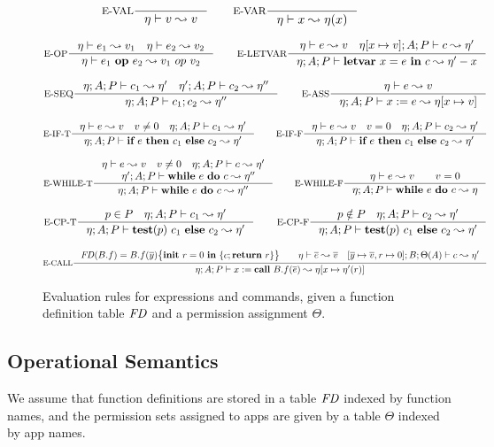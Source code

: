 \begin{figure*}[ht]
{\tiny
\[
\inference[E-VAL]{}{\eta \vdash \leVAL{v}  \leadsto v}
\qquad
\inference[E-VAR]{}{\eta \vdash \leVAR{x}  \leadsto \eta(x)}
\]

\[
\inference[E-OP]{\eta \vdash e_1 \leadsto v_1\quad \eta \vdash e_2 \leadsto v_2}
{\eta \vdash \leOP{e_1}{e_2} \leadsto v_1~op~v_2}
\qquad
\inference[E-LETVAR]{\eta \vdash e \leadsto v \quad \eta [ x \mapsto v ]; A ; P \vdash c \leadsto \eta'}
{\eta; A; P \vdash \lcLETVAR{x}{e}{c} \leadsto \eta' - x}
\]

\[
\inference[E-SEQ]{\eta;A; P \vdash c_1 \leadsto \eta' \quad \eta';A; P \vdash c_2 \leadsto \eta''}
{\eta;A;P \vdash \lcSEQ{c_1}{c_2} \leadsto \eta''}
\qquad
\inference[E-ASS]{\eta \vdash e \leadsto v}
{\eta; A; P \vdash \lcASS{x}{e} \leadsto \eta [ x \mapsto v ]}
\]

\[
\inference[E-IF-T]{\eta \vdash e \leadsto v\quad v\neq 0\quad \eta; A; P \vdash c_1 \leadsto \eta'}
{\eta; A; P \vdash \lcIF{e}{c_1}{c_2} \leadsto \eta'}
\qquad
\inference[E-IF-F]{\eta \vdash e \leadsto v\quad v = 0\quad \eta;A; P \vdash c_2 \leadsto \eta'}
{\eta;A; P \vdash \lcIF{e}{c_1}{c_2} \leadsto \eta'}
\]

\[
\inference[E-WHILE-T]{
\eta \vdash e \leadsto v\quad v\neq 0\quad
\eta;A; P \vdash c \leadsto \eta'\\
\quad \eta' ; A ; P \vdash \lcWHILE{e}{c} \leadsto \eta''
}
{\eta;A; P \vdash \lcWHILE{e}{c} \leadsto \eta''}
\qquad
\inference[E-WHILE-F]{\eta \vdash e \leadsto v\qquad v = 0}
{\eta;A; P \vdash \lcWHILE{e}{c} \leadsto \eta}
\]

\[
\inference[E-CP-T]{p\in P \quad \eta; A; P \vdash c_1 \leadsto \eta'}
{\eta; A ; P \vdash \lcCP{p}{c_1}{c_2} \leadsto \eta'}
\qquad
\inference[E-CP-F]{p\notin P \quad \eta;A;P \vdash c_2 \leadsto \eta'}
{\eta;A;P \vdash \lcCP{p}{c_1}{c_2} \leadsto \eta'}
\]

\[
\inference[E-CALL]{
\FD(B.f) = \lpPROG{B.f}{\overline{y}}{c}{\lpRES} \qquad
\eta\vdash\overline{e} \leadsto \overline{v} \quad
[\overline{y} \mapsto \overline{v}, r \mapsto 0] ; B; \Theta(A) \vdash c \leadsto \eta'}
{\eta;A;P \vdash \lcCALL{x}{B.f}{\overline{e}} \leadsto \eta[x \mapsto \eta'(r) ]}
\]
}
\caption{Evaluation rules for expressions and commands,
given a function definition table $\mathit{FD}$ and a permission assignment $\Theta.$
}
\label{fig:semantics}
\end{figure*}
 
\subsection{Operational Semantics}\label{sec:semantics}
We assume that function definitions are stored in a table $\mathit{FD}$ indexed by function names, and the permission sets assigned to apps are given by a table $\Theta$ indexed by app names.

